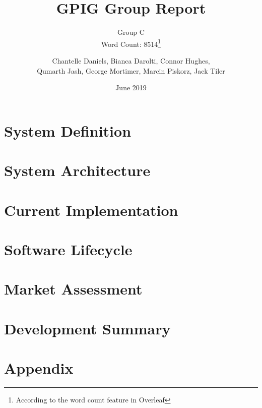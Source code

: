 \documentclass{UoYCSproject}
\title{GPIG Group Report}
\subtitle{Group C\\ Word Count: 8514\thanks{According to the word count feature in Overleaf}}
\author{Chantelle Daniels, Bianca Darolti, Connor Hughes,\\ Qumarth Jash, George Mortimer, Marcin Piskorz, Jack Tiler}
\date{June 2019}
\begin{document}
\maketitle
{}
\chapter{System Definition} \label{systemdef}


\chapter{System Architecture} \label{systemarch}


\chapter{Current Implementation} \label{currentimp}


\chapter{Software Lifecycle} \label{softwarelife}


\chapter{Market Assessment} \label{market}


\chapter{Development Summary} \label{devsummary}


\appendix
\chapter{Appendix}



\printbibliography
\end{document}
